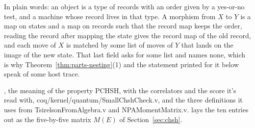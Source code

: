 In plain words: an object is a type of records with an order given by a yes-or-no test, and a
machine whose record lives in that type. A morphism from $X$ to $Y$ is a map on states and a map on
records such that the record map keeps the order, reading the record after mapping the state gives
the record map of the old record, and each move of $X$ is matched by some list of moves of $Y$ that
lands on the image of the new state. That last field asks for some list and names none, which is why
Theorem~\ref{thm:parts-nesting}(1) and the statement printed for it below speak of some host
trace.

{\raggedright {}, the meaning of the property PCHSH, with the correlators
and the score it's read with, coq/kernel/quantum/SmallChshCheck.v, and the three definitions it
uses from TsirelsonFromAlgebra.v and NPAMomentMatrix.v.  lays the ten entries
out as the five-by-five matrix $M(E)$ of Section~\ref{sec:chsh}.\par}

